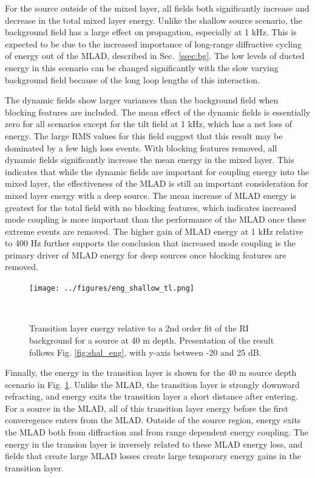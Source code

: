 \documentclass[preprint,NumberedRefs]{JASA}
\begin{document}
For the source outside of the mixed layer, all fields both significantly increase and decrease in the total mixed layer energy. Unlike the shallow source scenario, the background field has a large effect on propagation, especially at 1 kHz. This is expected to be due to the increased importance of long-range diffractive cycling of energy out of the MLAD, described in Sec.~\ref{ssec:bg}. The low levels of ducted energy in this scenario can be changed significantly with the slow varying background field because of the long loop lengths of this interaction.

The dynamic fields show larger variances than the background field when blocking features are included. The mean effect of the dynamic fields is essentially zero for all scenarios except for the tilt field at 1 kHz, which has a net loss of energy. The large RMS values for this field suggest that this result may be dominated by a few high loss events. With blocking features removed, all dynamic fields significantly increase the mean energy in the mixed layer. This indicates that while the dynamic fields are important for coupling energy into the mixed layer, the effectiveness of the MLAD is still an important consideration for mixed layer energy with a deep source. The mean increase of MLAD energy is greatest for the total field with no blocking features, which indicates increased mode coupling is more important than the performance of the MLAD once these extreme events are removed. The higher gain of MLAD energy at 1 kHz relative to 400 Hz further supports the conclusion that increased mode coupling is the primary driver of MLAD energy for deep sources once blocking features are removed.

\begin{figure}
\texttt{[image: ../figures/eng\_shallow\_tl.png]}
        \caption{Transition layer energy relative to a 2nd order fit of the RI background for a source at 40 m depth. Presentation of the result follows Fig. \ref{fig:shal_eng}, with y-axis between -20 and 25 dB.}
    \label{fig:eng_tl}
\end{figure}
Finnally, the energy in the transition layer is shown for the 40 m source depth scenario in Fig. \ref{fig:eng_tl}. Unlike the MLAD, the transition layer is strongly downward refracting, and energy exits the transition layer a short distance after entering. For a source in the MLAD, all of this transition layer energy before the first converegence enters from the MLAD. Outside of the source region, energy exits the MLAD both from diffraction and from range dependent energy coupling. The energy in the transion layer is inversely related to these MLAD energy loss, and fields that create large MLAD losses create large temporary energy gains in the transition layer.
\end{document}

